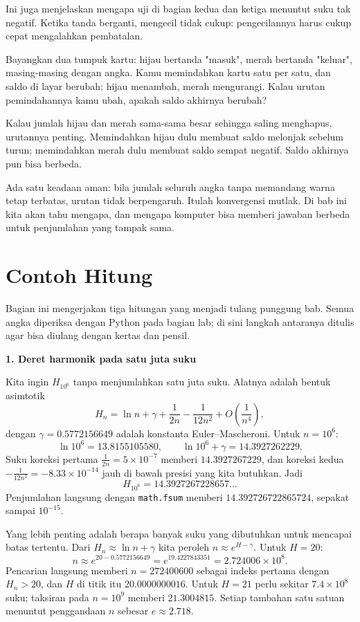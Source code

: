Ini juga menjelaskan mengapa uji di bagian kedua dan ketiga menuntut suku tak negatif.
Ketika tanda berganti, mengecil tidak cukup: pengecilannya harus cukup cepat mengalahkan
pembatalan.

\begin{untukanak}
Bayangkan dua tumpuk kartu: hijau bertanda "masuk", merah bertanda "keluar",
masing-masing dengan angka. Kamu memindahkan kartu satu per satu, dan saldo di layar
berubah: hijau menambah, merah mengurangi. Kalau urutan pemindahannya kamu ubah,
apakah saldo akhirnya berubah?

Kalau jumlah hijau dan merah sama-sama besar sehingga saling menghapus, urutannya
penting. Memindahkan hijau dulu membuat saldo melonjak sebelum turun; memindahkan
merah dulu membuat saldo sempat negatif. Saldo akhirnya pun bisa berbeda.

Ada satu keadaan aman: bila jumlah seluruh angka tanpa memandang warna tetap terbatas,
urutan tidak berpengaruh. Itulah konvergensi mutlak. Di bab ini kita akan tahu mengapa,
dan mengapa komputer bisa memberi jawaban berbeda untuk penjumlahan yang tampak sama.
\end{untukanak}

\section{Contoh Hitung}

Bagian ini mengerjakan tiga hitungan yang menjadi tulang punggung bab. Semua angka
diperiksa dengan Python pada bagian lab; di sini langkah antaranya ditulis agar bisa
diulang dengan kertas dan pensil.

\medskip\noindent\textbf{1. Deret harmonik pada satu juta suku}

Kita ingin $H_{10^6}$ tanpa menjumlahkan satu juta suku. Alatnya adalah bentuk
asimtotik
\[
  H_n = \ln n + \gamma + \frac{1}{2n} - \frac{1}{12n^2} + O\left(\frac{1}{n^4}\right),
\]
dengan $\gamma = 0.5772156649$ adalah konstanta Euler--Mascheroni. Untuk $n = 10^6$:
\[
  \ln 10^6 = 13.8155105580, \qquad \ln 10^6 + \gamma = 14.3927262229 .
\]
Suku koreksi pertama $\frac{1}{2n} = 5 \times 10^{-7}$ memberi
$14.3927267229$, dan koreksi kedua $-\frac{1}{12n^2} = -8.33 \times 10^{-14}$
jauh di bawah presisi yang kita butuhkan. Jadi
\[
  H_{10^6} = 14.3927267228657\ldots
\]
Penjumlahan langsung dengan \texttt{math.fsum} memberi $14.392726722865724$, sepakat
sampai $10^{-15}$.

Yang lebih penting adalah berapa banyak suku yang dibutuhkan untuk mencapai batas
tertentu. Dari $H_n \approx \ln n + \gamma$ kita peroleh $n \approx e^{H - \gamma}$.
Untuk $H = 20$:
\[
  n \approx e^{20 - 0.5772156649} = e^{19.4227843351} = 2.724006 \times 10^{8}.
\]
Pencarian langsung memberi $n = 272400600$ sebagai indeks pertama dengan $H_n > 20$,
dan $H$ di titik itu $20.0000000016$. Untuk $H = 21$ perlu sekitar
$7.4 \times 10^8$ suku; taksiran pada $n = 10^9$ memberi $21.3004815$. Setiap
tambahan satu satuan menuntut penggandaan $n$ sebesar $e \approx 2.718$.

